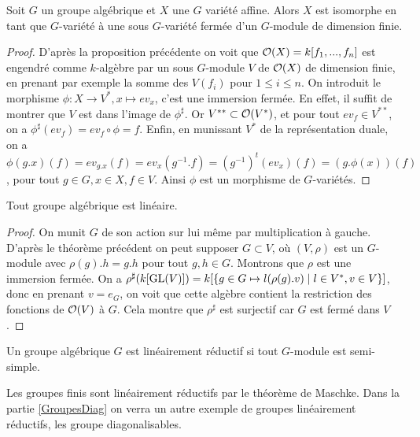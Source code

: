 \begin{thm}\label{embed}
Soit $G$ un groupe algébrique et $X$ une $G$ variété affine. Alors $X$ est isomorphe en tant que $G$-variété à une sous $G$-variété fermée d'un $G$-module de dimension finie.
\end{thm}
\begin{proof}
D'après la proposition précédente on voit que $\mathcal{O}(X)=k[f_1,...,f_n]$ est engendré comme $k$-algèbre par un sous $G$-module $V$ de $\mathcal{O}(X)$ de dimension finie, en prenant par exemple la somme des $V(f_i)$ pour $1\leq i\leq n$. On introduit le morphisme $\phi:X\rightarrow V^*, x\mapsto ev_x$, c'est une immersion fermée. En effet, il suffit de montrer que $V$ est dans l'image de $\phi^\sharp$. Or $V^{**}\subset \mathcal{O}(V^*)$, et pour tout $ev_f\in V^{**}$, on a $\phi^\sharp(ev_f)=ev_f\circ\phi=f$. Enfin, en munissant $V^*$ de la représentation duale, on a $\phi(g.x)(f)=ev_{g.x}(f)=ev_x( g^{-1}.f)=(g^{-1})^t(ev_x)(f)=(g.\phi(x))(f)$, pour tout $g\in G, x\in X,f\in V$. Ainsi $\phi$ est un morphisme de $G$-variétés.
\end{proof}

\begin{cor}
Tout groupe algébrique est linéaire.
\end{cor}
\begin{proof}
On munit $G$ de son action sur lui même par multiplication à gauche. D'après le théorème précédent on peut supposer $G\subset V$, où $(V,\rho)$ est un $G$-module avec $\rho(g).h=g.h$ pour tout $g,h\in G$. Montrons que $\rho$ est une immersion fermée. On a $\rho^\sharp(k[\operatorname{GL}(V)])=k[\lbrace g\in G\mapsto l(\rho(g).v)\mid l\in V^*,v\in V\rbrace]$, donc en prenant $v=e_G$, on voit que cette algèbre contient la restriction des fonctions de $\mathcal{O}(V)$ à $G$. Cela montre que $\rho^\sharp$ est surjectif car $G$ est fermé dans $V$.
\end{proof}

\begin{defn}
Un groupe algébrique $G$ est linéairement réductif si tout $G$-module est semi-simple.
\end{defn}

\begin{ex}
Les groupes finis sont linéairement réductifs par le théorème de Maschke. Dans la partie \ref{GroupesDiag} on verra un autre exemple de groupes linéairement réductifs, les groupe diagonalisables.
\end{ex}

